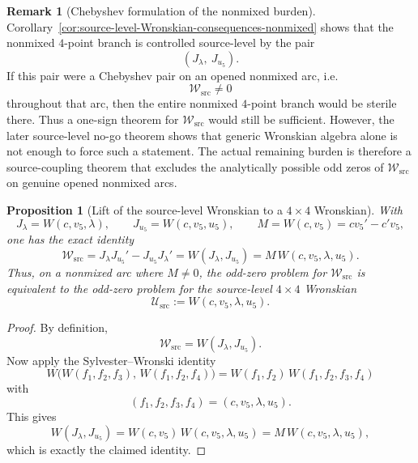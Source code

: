 \documentclass[11pt,a4paper]{amsart}
\theoremstyle{plain}
\newtheorem{proposition}[theorem]{Proposition}
\theoremstyle{definition}
\newtheorem{remark}[theorem]{Remark}
\begin{document}
\begin{remark}[Chebyshev formulation of the nonmixed burden]
\label{rem:Chebyshev-formulation-nonmixed}
Corollary~\ref{cor:source-level-Wronskian-consequences-nonmixed} shows that the
nonmixed $4$-point branch is controlled source-level by the pair
\[
(J_\lambda,\ J_{u_5}).
\]
If this pair were a Chebyshev pair on an opened nonmixed arc, i.e.
\[
\mathcal W_{\mathrm{src}}\neq 0
\]
throughout that arc, then the entire nonmixed $4$-point branch would be
sterile there. Thus a one-sign theorem for $\mathcal W_{\mathrm{src}}$ would
still be sufficient. However, the later source-level no-go theorem shows that
generic Wronskian algebra alone is not enough to force such a statement. The
actual remaining burden is therefore a source-coupling theorem that excludes
the analytically possible odd zeros of $\mathcal W_{\mathrm{src}}$ on genuine
opened nonmixed arcs.
\end{remark}

\begin{proposition}[Lift of the source-level Wronskian to a $4\times4$ Wronskian]
\label{prop:source-level-Wronskian-lifts-to-4x4}
With
\[
J_\lambda=W(c,v_5,\lambda),
\qquad
J_{u_5}=W(c,v_5,u_5),
\qquad
M=W(c,v_5)=cv_5'-c'v_5,
\]
one has the exact identity
\[
\boxed{
\mathcal W_{\mathrm{src}}
=
J_\lambda J_{u_5}'-J_{u_5}J_\lambda'
=
W(J_\lambda,J_{u_5})
=
M\,W(c,v_5,\lambda,u_5).
}
\]
Thus, on a nonmixed arc where $M\neq 0$, the odd-zero problem for
$\mathcal W_{\mathrm{src}}$ is equivalent to the odd-zero problem for the
source-level $4\times4$ Wronskian
\[
\mathcal U_{\mathrm{src}}:=W(c,v_5,\lambda,u_5).
\]
\end{proposition}

\begin{proof}
By definition,
\[
\mathcal W_{\mathrm{src}}=W(J_\lambda,J_{u_5}).
\]
Now apply the Sylvester--Wronski identity
\[
W\!\bigl(W(f_1,f_2,f_3),\,W(f_1,f_2,f_4)\bigr)
=
W(f_1,f_2)\,W(f_1,f_2,f_3,f_4)
\]
with
\[
(f_1,f_2,f_3,f_4)=(c,v_5,\lambda,u_5).
\]
This gives
\[
W(J_\lambda,J_{u_5})
=
W(c,v_5)\,W(c,v_5,\lambda,u_5)
=
M\,W(c,v_5,\lambda,u_5),
\]
which is exactly the claimed identity.
\end{proof}
\end{document}
